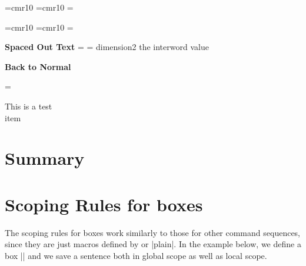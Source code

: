 \begin{teX}
\font \roman=cmr10
\font\specroman=cmr10
\newdimen\savedvalue
\savedvalue=\roman
\newdimen\specialvalue
\specialvalue=13.0pt
\def \rm{%
  \fontdimen2\roman=\savedvalue }
\def\specrm{%
  \aftergroup\restoredimen
  \fontdimen2\specroman=\specialvalue
  \specroman  }
\def\restoredimen{%
\fontdimen2\roman=\savedvalue }
\end{teX}
{
\font \roman=cmr10
\font\specroman=cmr10
\newdimen\savedvalue
\savedvalue=\roman
\newdimen\specialvalue
\specialvalue=13.0pt
\def \rm{%
  \fontdimen2\roman=\savedvalue }
\def\specrm{%
  \aftergroup\restoredimen
  \fontdimen2\specroman=\specialvalue
  \specroman  }
\def\restoredimen{%
\roman=\savedvalue }


{\bf Spaced Out Text} 
\medskip
{\specrm \lorem} dimension2 the interword   value \the{}\font


{\bf  Back to Normal}
\medskip

\rm
\lorem

}

This is a test \\{item}
\section{Summary}
\relax\bgroup\relax\egroup\relax 


\section*{Scoping Rules for boxes}

The scoping rules for boxes work similarly to those for other command sequences, since they are just macros defined by \latex or |plain|. In the example below, we define a box |\mybox| and we save a sentence both in global scope as well as local scope.




